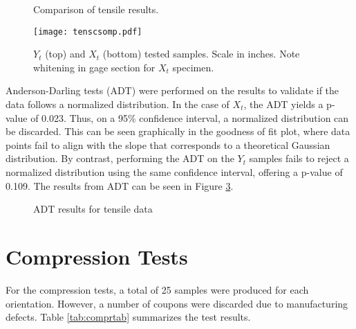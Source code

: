 \documentclass[main.tex]{subfiles}
\begin{document}
\begin{figure}[h]
	\center
	\captionsetup{justification=centering} %
	\caption{Comparison of tensile results.} \label{fig:tensComp}
\end{figure}

\begin{figure}[!htbp]
	\center
	\texttt{[image: tenscsomp.pdf]}
	\captionsetup{justification=centering} %
	\caption[$X_t$ and $Y_t$ tested samples]{$Y_t$ (top) and $X_t$ (bottom) tested samples. Scale in inches. Note whitening in gage section for $X_t$ specimen.} \label{fig:tensSComp}
\end{figure}

Anderson-Darling tests (ADT) were performed on the results to validate if the data follows a normalized distribution. In the case of $X_t$, the ADT yields a p-value of 0.023. Thus, on a 95\% confidence interval, a normalized distribution can be discarded. This can be seen graphically in the goodness of fit plot, where data points fail to align with the slope that corresponds to a theoretical Gaussian distribution. By contrast, performing the ADT on the $Y_t$ samples fails to reject a normalized distribution using the same confidence interval, offering a p-value of 0.109. %
The results from ADT can be seen in Figure \ref{fig:adttens}.

\begin{figure}[!htbp]
	\center
	\hfill
	\caption{ADT results for tensile data} \label{fig:adttens}
\end{figure}

\pagebreak
      
\section{Compression Tests} \label{sec:compr}
For the compression tests, a total of 25 samples were produced for each orientation. However, a number of coupons were discarded due to manufacturing defects. Table \ref{tab:comprtab} summarizes the test results.  
\end{document}
